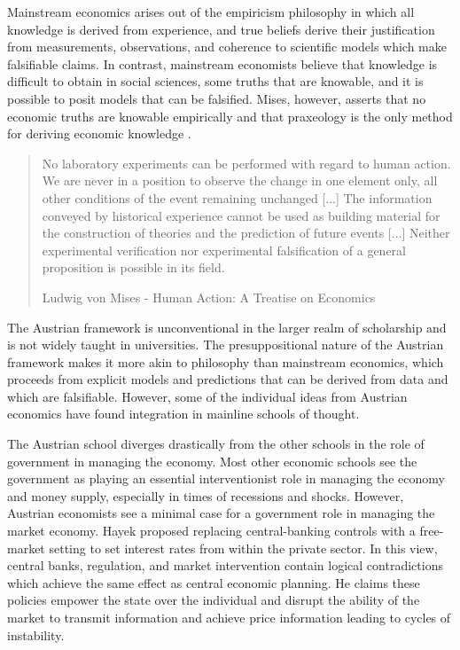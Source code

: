 
Mainstream economics arises out of the empiricism philosophy in which all
knowledge is derived from experience, and true beliefs derive their
justification from measurements, observations, and coherence to scientific
models which make falsifiable claims. In contrast, mainstream economists believe
that knowledge is difficult to obtain in social sciences, some truths that are
knowable, and it is possible to posit models that can be falsified. Mises,
however, asserts that no economic truths are knowable empirically and that
praxeology is the only method for deriving economic knowledge
\cite{golumbia2013cyberlibertarians, golumbia2013cyberlibertarianism}.

\begin{quote}
No laboratory experiments can be performed with regard to human action.
We are never in a position to observe the change in one element only,
all other conditions of the event remaining unchanged [...] The
information conveyed by historical experience cannot be used as building
material for the construction of theories and the prediction of future
events [...] Neither experimental verification nor experimental
falsification of a general proposition is possible in its field.
\begin{flushright}
Ludwig von Mises - Human Action: A Treatise on Economics
\end{flushright}
\end{quote}



The Austrian framework is unconventional in the larger realm of scholarship and
is not widely taught in universities. The presuppositional nature of the
Austrian framework makes it more akin to philosophy than mainstream economics,
which proceeds from explicit models and predictions that can be derived from
data and which are falsifiable. However, some of the individual ideas from
Austrian economics have found integration in mainline schools of thought.

The Austrian school diverges drastically from the other schools in the role of
government in managing the economy. Most other economic schools see the
government as playing an essential interventionist role in managing the economy
and money supply, especially in times of recessions and shocks. However,
Austrian economists see a minimal case for a government role in managing the
market economy. Hayek proposed replacing central-banking controls with a
free-market setting to set interest rates from within the private sector. In
this view, central banks, regulation, and market intervention contain logical
contradictions which achieve the same effect as central economic planning. He
claims these policies empower the state over the individual and disrupt the
ability of the market to transmit information and achieve price information
leading to cycles of instability.

